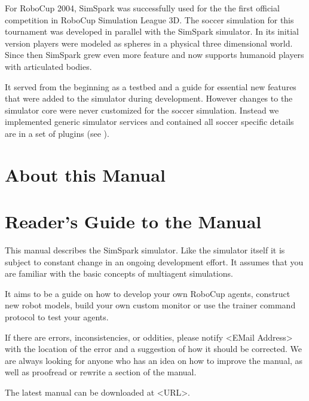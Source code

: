 For RoboCup 2004, SimSpark was successfully used for the the first
official competition in RoboCup Simulation League 3D.  The soccer
simulation for this tournament was developed in parallel with the
SimSpark simulator. In its initial version players were modeled as
spheres in a physical three dimensional world. Since then SimSpark
grew even more feature and now supports humanoid players with
articulated bodies.

It served from the beginning as a testbed and a guide for essential
new features that were added to the simulator during
development. However changes to the simulator core were never
customized for the soccer simulation. Instead we implemented generic
simulator services and contained all soccer specific details are in a
set of plugins (see \cite{OR05}).

\section{About this Manual}

\section{Reader's Guide to the Manual}


This manual describes the SimSpark simulator. Like the simulator
itself it is subject to constant change in an ongoing development
effort. It assumes that you are familiar with the basic concepts of
multiagent simulations.

It aims to be a guide on how to develop your own RoboCup agents,
construct new robot models, build your own custom monitor or use the
trainer command protocol to test your agents.

If there are errors, inconsistencies, or oddities, please notify
<EMail Address> with the location of the error and a suggestion of how
it should be corrected. We are always looking for anyone who has an
idea on how to improve the manual, as well as proofread or rewrite a
section of the manual.

The latest manual can be downloaded at <URL>.

